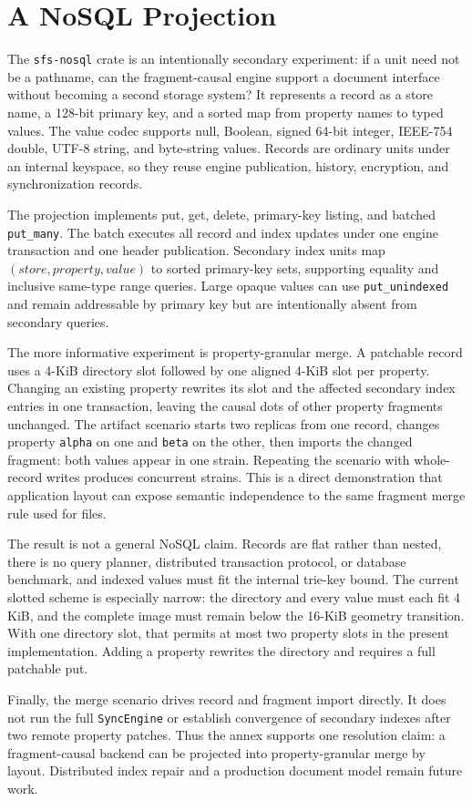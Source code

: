 \section{A NoSQL Projection}
\label{sec:annex-nosql}

The \texttt{sfs-nosql} crate is an intentionally secondary experiment: if a
unit need not be a pathname, can the fragment-causal engine support a document
interface without becoming a second storage system?  It represents a record as
a store name, a 128-bit primary key, and a sorted map from property names to
typed values.  The value codec supports null, Boolean, signed 64-bit integer,
IEEE-754 double, UTF-8 string, and byte-string values.  Records are ordinary
\sfs{} units under an internal keyspace, so they reuse engine publication,
history, encryption, and synchronization records.

The projection implements put, get, delete, primary-key listing, and batched
\texttt{put\_many}.  The batch executes all record and index updates under one
engine transaction and one header publication.  Secondary index units map
\((\mathit{store},\mathit{property},\mathit{value})\) to sorted primary-key
sets, supporting equality and inclusive same-type range queries.  Large opaque
values can use \texttt{put\_unindexed} and remain addressable by primary key
but are intentionally absent from secondary queries.

The more informative experiment is property-granular merge.  A patchable record
uses a 4-KiB directory slot followed by one aligned 4-KiB slot per property.
Changing an existing property rewrites its slot and the affected secondary
index entries in one transaction, leaving the causal dots of other property
fragments unchanged.  The artifact scenario starts two replicas from one
record, changes property \texttt{alpha} on one and \texttt{beta} on the other,
then imports the changed fragment: both values appear in one strain.  Repeating
the scenario with whole-record writes produces concurrent strains.  This is a
direct demonstration that application layout can expose semantic independence
to the same fragment merge rule used for files.

The result is not a general NoSQL claim.  Records are flat rather than nested,
there is no query planner, distributed transaction protocol, or database
benchmark, and indexed values must fit the internal trie-key bound.  The current
slotted scheme is especially narrow: the directory and every value must each
fit 4 KiB, and the complete image must remain below the 16-KiB geometry
transition.  With one directory slot, that permits at most two property slots
in the present implementation.  Adding a property rewrites the directory and
requires a full patchable put.

Finally, the merge scenario drives record and fragment import directly.  It does
not run the full \texttt{SyncEngine} or establish convergence of secondary
indexes after two remote property patches.  Thus the annex supports one
resolution claim: a fragment-causal backend can be projected into
property-granular merge by layout.  Distributed index repair and a production
document model remain future work.

